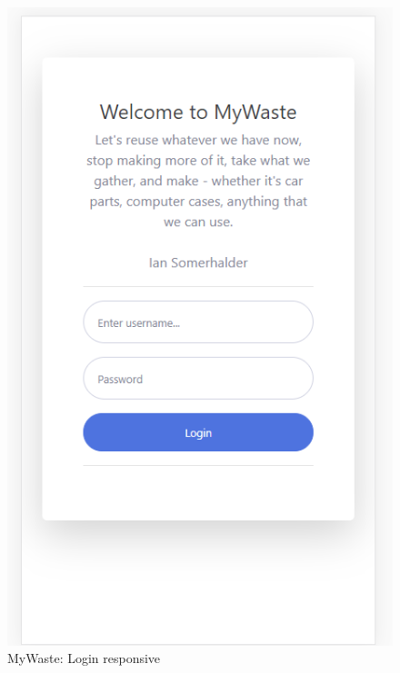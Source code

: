 \documentclass{report}
\begin{document}
\begin{figure}[h!]
    \begin{center}
        \includegraphics[width=1.0\textwidth]{images/login_responsive.PNG}  \end{center}
    \caption{MyWaste: Login responsive}
    \label{fig: resplogin}
\end{figure}
\end{document}
